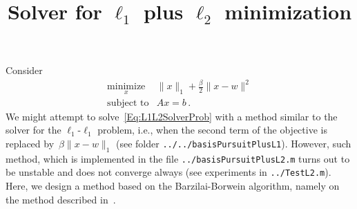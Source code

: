 \documentclass[letter,10pt]{article}
\title{Solver for $\ell_1$ plus $\ell_2$ minimization}
\author{}
\theoremstyle{definition}
\theoremstyle{nonumberplain}
\begin{document}
\maketitle

	Consider	
	\begin{equation}\label{Eq:L1L2SolverProb}
		\begin{array}{ll}
			\underset{x}{\text{minimize}} & \|x\|_1 + \frac{\beta}{2}\|x - w\|^2 \\
			\text{subject to} & Ax = b\,.
		\end{array}		
	\end{equation}
	We might attempt to solve~\eqref{Eq:L1L2SolverProb} with a method similar to the solver for the $\ell_1$-$\ell_1$ problem, i.e., when the second term of the objective is replaced by~$\beta\|x-w\|_1$ (see folder \verb#../../basisPursuitPlusL1#). However, such method, which is implemented in the file \verb#../basisPursuitPlusL2.m# turns out to be unstable and does not converge always (see experiments in \verb#../TestL2.m#). Here, we design a method based on the Barzilai-Borwein algorithm, namely on the method described in~\cite{Birgin00-NonmonotoneSpectralProjectedGradient}.
	
\end{document}
